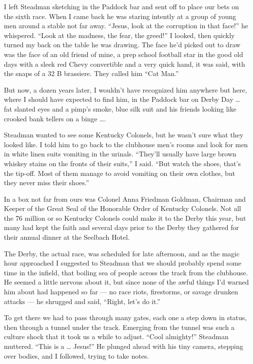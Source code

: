 \documentclass[10pt,a4paper]{article}
\begin{document}
I left Steadman sketching in the Paddock bar and sent off to place our bets on the sixth race. When I came back he was staring intently at a group of young men around a stable not far away. “Jesus, look at the corruption in that face!” he whispered. “Look at the madness, the fear, the greed!” I looked, then quickly turned my back on the table he was drawing. The face he’d picked out to draw was the face of an old friend of mine, a prep school football star in the good old days with a sleek red Chevy convertible and a very quick hand, it was said, with the snaps of a 32 B brassiere. They called him “Cat Man.”

But now, a dozen years later, I wouldn’t have recognized him anywhere but here, where I should have expected to find him, in the Paddock bar on Derby Day … fat slanted eyes and a pimp’s smoke, blue silk suit and his friends looking like crooked bank tellers on a binge ….

Steadman wanted to see some Kentucky Colonels, but he wasn’t sure what they looked like. I told him to go back to the clubhouse men’s rooms and look for men in white linen suits vomiting in the urinals. “They’ll usually have large brown whiskey stains on the fronts of their suits,” I said. “But watch the shoes, that’s the tip-off. Most of them manage to avoid vomiting on their own clothes, but they never miss their shoes.”

In a box not far from ours was Colonel Anna Friedman Goldman, Chairman and Keeper of the Great Seal of the Honorable Order of Kentucky Colonels. Not all the 76 million or so Kentucky Colonels could make it to the Derby this year, but many had kept the faith and several days prior to the Derby they gathered for their annual dinner at the Seelbach Hotel.

The Derby, the actual race, was scheduled for late afternoon, and as the magic hour approached I suggested to Steadman that we should probably spend some time in the infield, that boiling sea of people across the track from the clubhouse. He seemed a little nervous about it, but since none of the awful things I’d warned him about had happened so far — no race riots, firestorms, or savage drunken attacks — he shrugged and said, “Right, let’s do it.”

To get there we had to pass through many gates, each one a step down in status, then through a tunnel under the track. Emerging from the tunnel was such a culture shock that it took us a while to adjust. “Cool almighty!” Steadman muttered. “This is a … Jesus!” He plunged ahead with his tiny camera, stepping over bodies, and I followed, trying to take notes.
\end{document}
